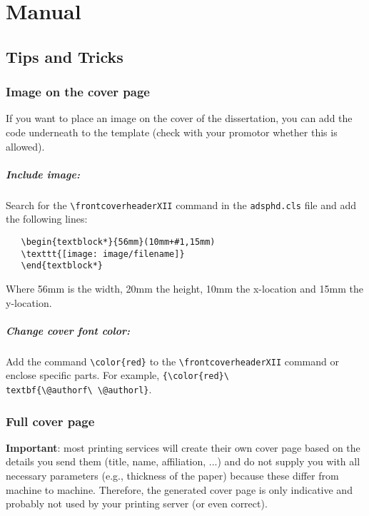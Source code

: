 \chapter{Manual}\label{ch:manual}


\section{Tips and Tricks}

\subsection{Image on the cover page}

If you want to place an image on the cover of the dissertation, you can add
the code underneath to the template (check with your promotor whether this is
allowed).

\paragraph{Include image:}
Search for the \texttt{\textbackslash frontcoverheaderXII} command in
the \texttt{adsphd.cls} file and add the following lines:
\begin{verbatim}
   \begin{textblock*}{56mm}(10mm+#1,15mm)
   \texttt{[image: image/filename]}
   \end{textblock*}
\end{verbatim}
Where 56mm is the width, 20mm the height, 10mm the x-location and 15mm the
y-location.

\paragraph{Change cover font color:}
Add the command \texttt{\textbackslash color\{red\}} to the
\texttt{\textbackslash frontcoverheaderXII} command or enclose specific parts.
For example, \texttt{\{\textbackslash color\{red\}\textbackslash
textbf\{\textbackslash @authorf\textbackslash\ \textbackslash @authorl\}}.

\subsection{Full cover page}

\textbf{Important}: most printing services will create their own cover page based
on the details you send them (title, name, affiliation, ...) and do not supply
you with all necessary parameters (e.g., thickness of the paper) because these
differ from machine to machine. Therefore, the generated cover page is only
indicative and probably not used by your printing server (or even correct).


